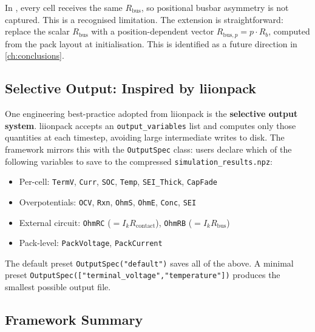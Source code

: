 In \VIBE{}, every cell receives the same $R_\text{bus}$, so positional busbar asymmetry is not captured. This is a recognised limitation. The extension is straightforward: replace the scalar $R_\text{bus}$ with a position-dependent vector $R_{\text{bus},p} = p \cdot R_b$, computed from the pack layout at initialisation. This is identified as a future direction in \cref{ch:conclusions}.

\subsection{Selective Output: Inspired by liionpack}
\label{ssec:selective_output_ch7}

One engineering best-practice adopted from liionpack is the \textbf{selective output system}. liionpack accepts an \texttt{output\_variables} list and computes only those quantities at each timestep, avoiding large intermediate writes to disk. The \VIBE{} framework mirrors this with the \texttt{OutputSpec} class: users declare which of the following variables to save to the compressed \texttt{simulation\_results.npz}:

\begin{itemize}\setlength\itemsep{0pt}
  \item Per-cell: \texttt{TermV}, \texttt{Curr}, \texttt{SOC}, \texttt{Temp}, \texttt{SEI\_Thick}, \texttt{CapFade}
  \item Overpotentials: \texttt{OCV}, \texttt{Rxn}, \texttt{OhmS}, \texttt{OhmE}, \texttt{Conc}, \texttt{SEI}
  \item External circuit: \texttt{OhmRC} ($= I_k R_\text{contact}$), \texttt{OhmRB} ($= I_k R_\text{bus}$)
  \item Pack-level: \texttt{PackVoltage}, \texttt{PackCurrent}
\end{itemize}

The default preset \texttt{OutputSpec("default")} saves all of the above. A minimal preset \texttt{OutputSpec(["terminal\_voltage","temperature"])} produces the smallest possible output file.

\subsection{Framework Summary}
\label{ssec:framework_summary}

